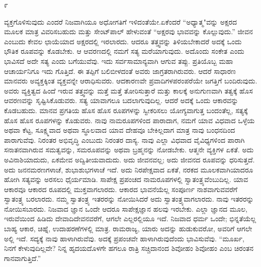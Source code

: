 \begin{center}
೯
\end{center}

ವ್ಯಕ್ತಗೊಳಿಸುವುದು ಎಂದರೆ ನಿಜವಾಗಿಯೂ ಅಧೋಗತಿಗೆ ಇಳಿದಂತೆಯೇ.\break ಏಕೆಂದರೆ “ಅಧ್ಯಾತ್ಮ"ವನ್ನು ಅಕ್ಷರದ ಮೂಲಕ ಮಾತ್ರ ವಿವರಿಸಬಹುದು ಮತ್ತು ಸೇಂಟ್‌ಪಾಲ್ ಹೇಳುವಂತೆ “ಅಕ್ಷರವು ಭಾವವನ್ನು ಕೊಲ್ಲುವುದು.'' ಜೀವನ ಎಂಬುದು ಕೇವಲ ಛಾಯೆಯಾದ ಅಕ್ಷರದಲ್ಲಿ ಇರಲಾರದು. ಆದರೂ ತತ್ತ್ವವನ್ನು ತಿಳಿಯಬೇಕಾದರೆ ಅದಕ್ಕೆ ಒಂದು ಭೌತಿಕ ರೂಪವನ್ನು ಕೊಡಬೇಕು. ಆ ಆವರಣದಲ್ಲಿ ನಮಗೆ ಸತ್ಯ ಮರೆಯಾಗು\-ವುದು. ಅದೊಂದು ಸಂಕೇತ ಎಂದು ಭಾವಿಸದೆ ಅದೇ ಸತ್ಯ ಎಂದು ಬಗೆಯುವೆವು. ಇದು ಸರ್ವಸಾಮಾನ್ಯವಾಗಿ ಆಗುವ ತಪ್ಪು. ಪ್ರತಿಯೊಬ್ಬ ಮಹಾ ಆಚಾರ್ಯನಿಗೂ ಇದು ಗೊತ್ತಿದೆ. ಈ ತಪ್ಪಿಗೆ ಬಲಿಬೀಳದಂತೆ ಅವರು ಜಾಗ್ರತರಾಗಿರುವರು. ಆದರೆ ಸಾಧಾರಣ ಮಾನವರು ಅವ್ಯಕ್ತಕ್ಕಿಂತ ವ್ಯಕ್ತವನ್ನೇ ಆರಾಧಿಸುವರು. ಆದಕಾರಣವೇ ಪ್ರವಾದಿಗಳ\break ಪರಂಪರೆಯೇ ಜಗತ್ತಿಗೆ ಬಂದಿರುವುದು. ಅವರು ವ್ಯಕ್ತಿತ್ವದ ಹಿಂದೆ ಇರುವ ತತ್ತ್ವವನ್ನು ಮತ್ತೆ ಮತ್ತೆ ತೋರಿಸುತ್ತಾರೆ ಮತ್ತು ಕಾಲಕ್ಕೆ ಅನುಗುಣವಾಗಿ ತತ್ವಕ್ಕೆ ಹೊಸ ಆವರಣವನ್ನು ಸೃಷ್ಟಿಸಿಕೊಡುವರು. ಸತ್ಯ ಯಾವಾಗಲೂ ಬದಲಾಗುವುದಿಲ್ಲ. ಆದರೆ ಅದಕ್ಕೆ ಒಂದು ಆಕಾರವನ್ನು ಕೊಡಬಹುದು. ಮಾನವ ಪ್ರಗತಿಯ ಹೊಸ ಹೊಸ ರೂಪಗಳನ್ನು ಸ್ವೀಕರಿಸಲು ಯೋಗ್ಯವಾಗುತ್ತ ಬಂದಂತೆಲ್ಲ, ಸತ್ಯಕ್ಕೆ ಹೊಸ ಹೊಸ ರೂಪಗಳನ್ನು ಕೊಡುವರು. ನಾವು ನಾಮರೂಪಗಳಿಂದ ಪಾರಾದಾಗ, ನಮಗೆ ಯಾವ ವಿಧವಾದ ಒಳ್ಳೆಯ ಅಥವಾ ಕೆಟ್ಟ, ಸೂಕ್ಷ್ಮವಾದ ಅಥವಾ ಸ್ಥೂಲವಾದ ಯಾವ ದೇಹವೂ ಬೇಕಿಲ್ಲದಾಗ ಮಾತ್ರ ನಾವು ಬಂಧನದಿಂದ ಪಾರಾಗುವೆವು. ನಿರಂತರ ಅಭಿವೃದ್ಧಿ ಎಂಬುದು ನಿರಂತರ ದಾಸ್ಯ. ನಾವು ಎಲ್ಲಾ ವಿಧವಾದ ವೈವಿಧ್ಯಗಳಿಂದ ಪಾರಾಗಿ ಸನಾತನವಾಗಿರುವ ಸಮತ್ವವನ್ನು, ಸಮರೂಪವನ್ನು ಅಥವಾ ಬ್ರಹ್ಮನನ್ನು ನೋಡಬೇಕು. ಆತ್ಮನೇ ವ್ಯಕ್ತಿಗಳ ಏಕತೆ. ಅದು ಅವಿನಾಶಿಯಾದುದು, ಏಕಮೇವ ಅದ್ವಿತೀಯವಾದುದು. ಅದು ಜೀವನವಲ್ಲ; ಅದು ಜೀವನದ ರೂಪವನ್ನು ಧರಿಸುತ್ತದೆ. ಅದು ಜನನಮರಣಗಳಾಚೆ, ಶುಭಾಶುಭಗಳಾಚೆ ಇದೆ. ಅದು ನಿರಪೇಕ್ಷವಾದ ಏಕತೆ, ನರಕದ ಮೂಲಕವಾಗಿಯಾದರೂ ಹೋಗಿ ಸತ್ಯವನ್ನು ಅರಸಲು ಧೈರ್ಯಮಾಡಿ. ಸಾಪೇಕ್ಷ ಪ್ರಪಂಚದ ನಾಮರೂಪಗಳಲ್ಲಿ ಸ್ವಾತಂತ್ರ್ಯವೆಂಬುದಿಲ್ಲ. ಯಾವ ಆಕಾರವೂ ಆಕಾರದ ರೂಪದಲ್ಲಿ ಮುಕ್ತವಾಗಲಾರದು. ಆಕಾರದ ಭಾವನೆಯೆಲ್ಲ ಸಂಪೂರ್ಣ ನಾಶವಾಗುವವರೆಗೆ ಸ್ವಾತಂತ್ರ್ಯ ಬರಲಾರದು. ನಮ್ಮ ಸ್ವಾತಂತ್ರ್ಯ ಇತರರನ್ನು ನೋಯಿಸಿದರೆ ಅದು ಸ್ವಾತಂತ್ರ್ಯವಾಗಲಾರದು. ನಾವು ಇತರರನ್ನು ನೋಯಿಸಬಾರದು. ನಿಜವಾದ ಜ್ಞಾನ ಒಂದೇ ಆದರೂ ಸಾಪೇಕ್ಷಜ್ಞಾನ ಹಲವು ಇರಬೇಕು. ಎಲ್ಲಾ ಜ್ಞಾನದ ಮೂಲ, ಇರುವೆಯಿಂದ ಹಿಡಿದು ದೇವಾದಿದೇವನವರೆಗೆ, ಆಗಲೇ ಎಲ್ಲರಲ್ಲಿಯೂ ಇದೆ. ನಿಜವಾದ ಧರ್ಮ ಒಂದೇ; ಭಿನ್ನತೆಯೆಲ್ಲ ಬಾಹ್ಯ ಆಕಾರ, ಚಿಹ್ನೆ, ಉದಾಹರಣೆಗಳಲ್ಲಿ ಮಾತ್ರ. ರಾಮರಾಜ್ಯ, ಯಾರು ಅದನ್ನು ಹುಡುಕುವರೋ, ಅವರಿಗೆ ಆಗಲೇ ಅಲ್ಲಿ ಇದೆ. ಸದ್ಯಕ್ಕೆ ನಾವು ಹಾಳಾಗಿರುವೆವು. ಅದಕ್ಕೆ ಪ್ರಪಂಚವೇ ಹಾಳಾಗಿರುವುದೆಂದು ಭಾವಿಸುವೆವು. “ಮೂರ್ಖ, ನಿನಗೆ ಕೇಳುವುದಿಲ್ಲವೇ? ನಿನ್ನ ಹೃದಯದೊಳಗೇ ಹಗಲೂ ರಾತ್ರಿ ಸಚ್ಚಿದಾನಂದ ಶಿವೋಹಂ ಶಿವೋಹಂ ಎಂಬ ಚಿರಂತನ ಗಾನವಾಗುತ್ತಿದೆ.''

